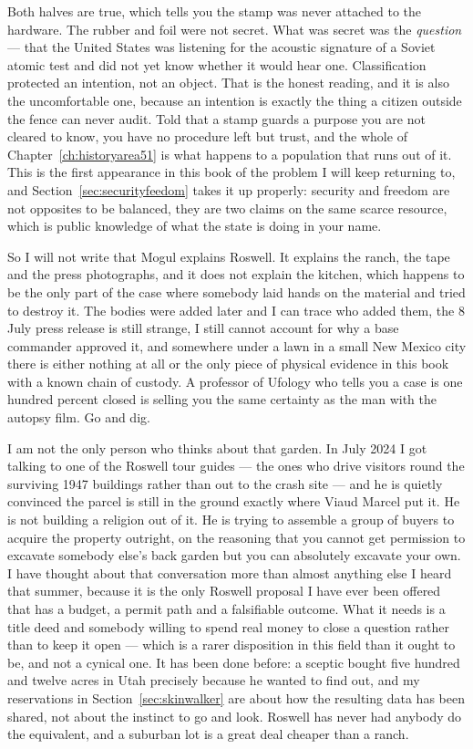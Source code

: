Both halves are true, which tells you the stamp was never attached to the hardware. The rubber and
foil were not secret. What was secret was the \emph{question} --- that the United States was
listening for the acoustic signature of a Soviet atomic test and did not yet know whether it would
hear one. Classification protected an intention, not an object. That is the honest reading, and it is
also the uncomfortable one, because an intention is exactly the thing a citizen outside the fence can
never audit. Told that a stamp guards a purpose you are not cleared to know, you have no procedure
left but trust, and the whole of Chapter~\ref{ch:historyarea51} is what happens to a population that
runs out of it. This is the first appearance in this book of the problem I will keep returning to,
and Section~\ref{sec:securityfeedom} takes it up properly: security and freedom are not opposites to
be balanced, they are two claims on the same scarce resource, which is public knowledge of what the
state is doing in your name.

So I will not write that Mogul explains Roswell. It explains the ranch, the tape and the press
photographs, and it does not explain the kitchen, which happens to be the only part of the case where
somebody laid hands on the material and tried to destroy it. The bodies were added later and I can
trace who added them, the 8 July
press release is still strange, I still cannot account for why a base commander approved it, and
somewhere under a lawn in a small New Mexico city there is either nothing at all or the only piece of
physical evidence in this book with a known chain of custody. A professor of Ufology who tells you a
case is one hundred percent closed is selling you the same certainty as the man with the autopsy film.
Go and dig.

\begin{funfact}
I am not the only person who thinks about that garden. In July 2024 I got talking to one of the
Roswell tour guides --- the ones who drive visitors round the surviving 1947 buildings rather than out
to the crash site --- and he is quietly convinced the parcel is still in the ground exactly where Viaud
Marcel put it. He is not building a religion out of it. He is trying to assemble a group of buyers to
acquire the property outright, on the reasoning that you cannot get permission to excavate somebody
else's back garden but you can absolutely excavate your own. I have thought about that conversation
more than almost anything else I heard that summer, because it is the only Roswell proposal I have ever
been offered that has a budget, a permit path and a falsifiable outcome. What it needs is a title deed
and somebody willing to spend real money to close a question rather than to keep it open --- which is a
rarer disposition in this field than it ought to be, and not a cynical one. It has been done before: a
sceptic bought five hundred and twelve acres in Utah precisely because he wanted to find out, and my
reservations in Section~\ref{sec:skinwalker} are about how the resulting data has been shared, not
about the instinct to go and look. Roswell has never had anybody do the equivalent, and a suburban
lot is a great deal cheaper than a ranch.
\end{funfact}

